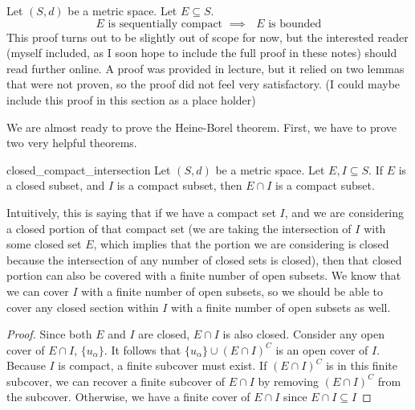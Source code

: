\begin{thm}{}{}
Let \((S, d)\) be a metric space. Let \(E \subseteq S\). \newline 
\begin{equation*}
  \textrm{\(E\) is sequentially compact \(\implies\) \(E\) is bounded}
\end{equation*}
This proof turns out to be slightly out of scope for now, but the interested reader (myself included, as I soon hope to include the full proof in these notes) should read further online. A proof was provided in lecture, but it relied on two lemmas that were not proven, so the proof did not feel very satisfactory. (I could maybe include this proof in this section as a place holder)
\end{thm}

We are almost ready to prove the Heine-Borel theorem. First, we have to prove two very helpful theorems.\newline

\begin{thm}{}{closed_compact_intersection}
Let \((S, d)\) be a metric space. Let \(E, I \subseteq S\). \newline 
If \(E\) is a closed subset, and \(I\) is a compact subset, then \(E \cap I\) is a compact subset.\newline 

Intuitively, this is saying that if we have a compact set \(I\), and we are considering a closed portion of that compact set (we are taking the intersection of \(I\) with some closed set \(E\), which implies that the portion we are considering is closed because the intersection of any number of closed sets is closed), then that closed portion can also be covered with a finite number of open subsets. We know that we can cover \(I\) with a finite number of open subsets, so we should be able to cover any closed section within \(I\) with a finite number of open subsets as well.
\begin{proof}
Since both \(E\) and \(I\) are closed, \(E \cap I\) is also closed. Consider any open cover of \(E \cap I\), \(\{u_\alpha\}\). It follows that \(\{u_\alpha\} \cup (E \cap I)^C\) is an open cover of \(I\). Because \(I\) is compact, a finite subcover must exist. If \((E \cap I)^C\) is in this finite subcover, we can recover a finite subcover of \(E \cap I\) by removing \((E \cap I)^C\) from the subcover. Otherwise, we have a finite cover of \(E \cap I\) since \(E \cap I \subseteq I\)
\end{proof}

\end{thm}

